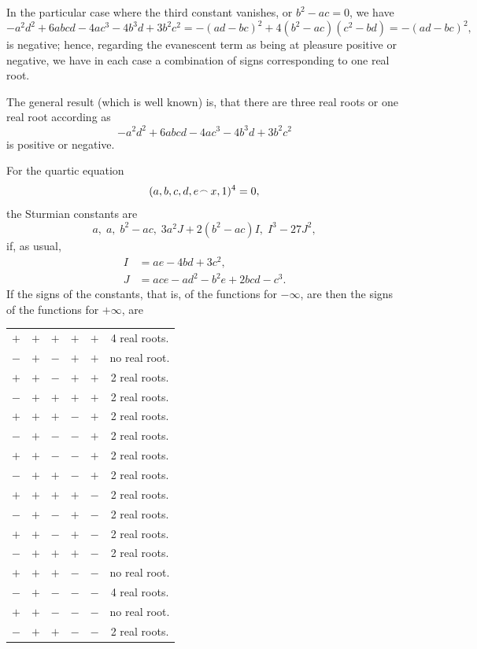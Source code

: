 \documentclass[11pt,a4paper]{book}
\begin{document}
In the particular case where the third constant vanishes, or $b^2 - ac = 0$, we have
\[
-a^2d^2 + 6abcd - 4ac^3 - 4b^3d + 3b^2c^2 = -(ad - bc)^2 + 4(b^2 - ac)(c^2 - bd) = -(ad - bc)^2,
\]
is negative; hence, regarding the evanescent term as being at pleasure positive or negative, we have in each case a combination of signs corresponding to one real root.

The general result (which is well known) is, that there are three real roots or one real root according as
\[
-a^2d^2 + 6abcd - 4ac^3 - 4b^3d + 3b^2c^2
\]
is positive or negative.

For the quartic equation
\[
(a, b, c, d, e \mathbin{\vcenter{\hbox{$\scriptstyle\!\frown$}}} x, 1)^4 = 0,
\]
the Sturmian constants are
\[
a,\; a,\; b^2 - ac,\; 3a^2J + 2(b^2 - ac)I,\; I^3 - 27J^2,
\]
if, as usual,
\begin{align*}
I &= ae - 4bd + 3c^2,\\
J &= ace - ad^2 - b^2e + 2bcd - c^3.
\end{align*}
If the signs of the constants, that is, of the functions for $-\infty$, are then the signs of the functions for $+\infty$, are
\begin{center}
\begin{tabular}{ccccc|c}
$+$ & $+$ & $+$ & $+$ & $+$ & 4 real roots.\\
$-$ & $+$ & $-$ & $+$ & $+$ & no real root.\\
$+$ & $+$ & $-$ & $+$ & $+$ & 2 real roots.\\
$-$ & $+$ & $+$ & $+$ & $+$ & 2 real roots.\\
$+$ & $+$ & $+$ & $-$ & $+$ & 2 real roots.\\
$-$ & $+$ & $-$ & $-$ & $+$ & 2 real roots.\\
$+$ & $+$ & $-$ & $-$ & $+$ & 2 real roots.\\
$-$ & $+$ & $+$ & $-$ & $+$ & 2 real roots.\\
$+$ & $+$ & $+$ & $+$ & $-$ & 2 real roots.\\
$-$ & $+$ & $-$ & $+$ & $-$ & 2 real roots.\\
$+$ & $+$ & $-$ & $+$ & $-$ & 2 real roots.\\
$-$ & $+$ & $+$ & $+$ & $-$ & 2 real roots.\\
$+$ & $+$ & $+$ & $-$ & $-$ & no real root.\\
$-$ & $+$ & $-$ & $-$ & $-$ & 4 real roots.\\
$+$ & $+$ & $-$ & $-$ & $-$ & no real root.\\
$-$ & $+$ & $+$ & $-$ & $-$ & 2 real roots.
\end{tabular}
\end{center}
\end{document}
